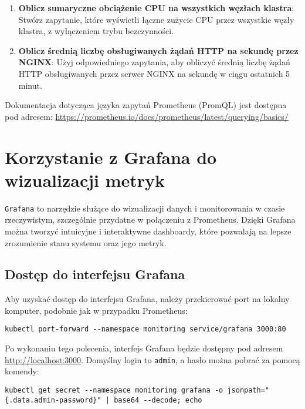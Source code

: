 \documentclass{article}
\begin{document}
\begin{enumerate}
    \item \textbf{Oblicz sumaryczne obciążenie CPU na wszystkich węzłach klastra}: Stwórz zapytanie, które wyświetli łączne zużycie CPU przez wszystkie węzły klastra, z wyłączeniem trybu bezczynności.

    \item \textbf{Oblicz średnią liczbę obsługiwanych żądań HTTP na sekundę przez NGINX}: Użyj odpowiedniego zapytania, aby obliczyć średnią liczbę żądań HTTP obsługiwanych przez serwer NGINX na sekundę w ciągu ostatnich 5 minut.

\end{enumerate}

Dokumentacja dotycząca języka zapytań Prometheus (PromQL) jest dostępna pod adresem: \url{https://prometheus.io/docs/prometheus/latest/querying/basics/}

\section{Korzystanie z Grafana do wizualizacji metryk}

\texttt{Grafana} to narzędzie służące do wizualizacji danych i monitorowania w czasie rzeczywistym, szczególnie przydatne w połączeniu z Prometheus. Dzięki Grafana można tworzyć intuicyjne i interaktywne dashboardy, które pozwalają na lepsze zrozumienie stanu systemu oraz jego metryk.

\subsection{Dostęp do interfejsu Grafana}

Aby uzyskać dostęp do interfejsu Grafana, należy przekierować port na lokalny komputer, podobnie jak w przypadku Prometheus:

\begin{lstlisting}
kubectl port-forward --namespace monitoring service/grafana 3000:80
\end{lstlisting}

Po wykonaniu tego polecenia, interfejs Grafana będzie dostępny pod adresem \url{http://localhost:3000}. Domyślny login to \texttt{admin}, a hasło można pobrać za pomocą komendy:

\begin{lstlisting}
kubectl get secret --namespace monitoring grafana -o jsonpath="{.data.admin-password}" | base64 --decode; echo
\end{lstlisting}
\end{document}
